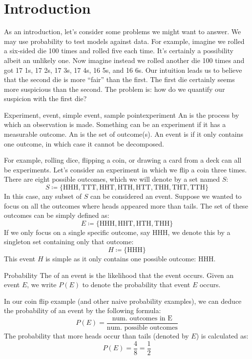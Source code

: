 \chapter{Introduction}

As an introduction, let's consider some problems we might want to answer. We may use probability to test models against data. For example, imagine we rolled a six-sided die 100 times and rolled five each time. It's certainly a possibility albeit an unlikely one. Now imagine instead we rolled another die 100 times and got 17 1s, 17 2s, 17 3s, 17 4s, 16 5s, and 16 6s. Our intuition leads us to believe that the second die is more ``fair'' than the first. The first die certainly seems more suspicious than the second. The problem is: how do we quantify our suspicion with the first die?

\begin{dfnbox}{Experiment, event, simple event, sample point}{experiment}
    An  is the process by which an observation is made. Something can be an experiment if it has a measurable outcome. An  is the set of outcome(s). An event is  if it only contains one outcome, in which case it cannot be decomposed.
\end{dfnbox}

For example, rolling dice, flipping a coin, or drawing a card from a deck can all be experiments. Let's consider an experiment in which we flip a coin three times. There are eight possible outcomes, which we will denote by a set named $S$:
\[ S \coloneq \{ \text{HHH}, \text{TTT}, \text{HHT}, \text{HTH}, \text{HTT}, \text{THH}, \text{THT}, \text{TTH} \} \]
In this case, any subset of $S$ can be considered an event. Suppose we wanted to focus on all the outcomes where heads appeared more than tails. The set of these outcomes can be simply defined as:
\[ E \coloneq \{ \text{HHH}, \text{HHT}, \text{HTH}, \text{THH} \} \]
If we only focus on a single specific outcome, say $\text{HHH}$, we denote this by a singleton set containing only that outcome:
\[ H \coloneq \{ \text{HHH} \} \]
This event $H$ is simple as it only contains one possible outcome: $\text{HHH}$.

\begin{dfnbox}{Probability}{}
    The  of an event is the likelihood that the event occurs. Given an event $E$, we write $P(E)$ to denote the probability that event $E$ occurs.
\end{dfnbox}

In our coin flip example (and other naive probability examples), we can deduce the probability of an event by the following formula:
\[ P(E) = \frac{\text{num. outcomes in E}}{\text{num. possible outcomes}} \]
The probability that more heads occur than tails (denoted by $E$) is calculated as:
\[ P(E) = \frac{4}{8} = \frac{1}{2} \]


